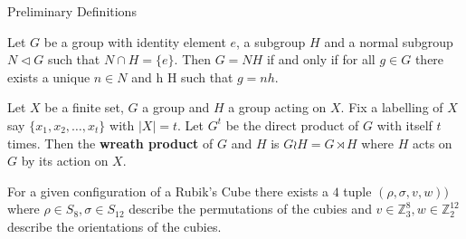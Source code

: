 \documentclass[final]{beamer}
\newlength{\colwidth}
\begin{document}
\begin{frame}[t]
\begin{columns}[t]
\begin{column}{\colwidth}



  \begin{alertblock}{Preliminary Definitions}


     Let $G$ be a group with identity element $e$, a subgroup $H$ and a normal subgroup $N \triangleleft G$ such that $N \cap H = \{e\}$.
    Then $G = N H$ if and only if for all $g \in G$ there exists a unique $n \in N$ and h \in H such that $g = nh$.


Let $X$ be a finite set, $G$ a group and $H$ a group acting on $X$.
Fix a labelling of $X$ say $\{x_1,x_2, \dots, x_t\}$ with $| X | = t$.
Let $G^t$ be the direct product of $G$ with itself $t$ times.
Then the \textbf{wreath product} of $G$ and $H$ is $G \wr H = G \rtimes H$ where $H$ acts on $G$ by its action on $X$.





    

For a given configuration of a Rubik's Cube there exists a $4$ tuple $(\rho, \sigma, v, w))$ where $\rho \in S_8, \sigma \in S_{12}$ describe the permutations of the cubies and $v \in \mathbb Z_3^8, w \in \mathbb Z_2^{12}$ describe the orientations of the cubies.


\end{alertblock}
\end{column}
\end{columns}
\end{frame}
\end{document}
